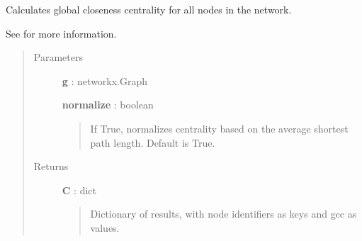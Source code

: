 \documentclass[letterpaper,10pt,english]{sphinxmanual}
\begin{document}
\begin{fulllineitems}
\label{tethne.analyze:tethne.analyze.graph.global_closeness_centrality}
Calculates global closeness centrality for all nodes in the network.

See {\hyperref[tethne.analyze:tethne.analyze.graph.node_global_closeness_centrality]{}} for more information.
\begin{quote}\begin{description}
\item[{Parameters }] \leavevmode
\textbf{g} : networkx.Graph

\textbf{normalize} : boolean
\begin{quote}

If True, normalizes centrality based on the average shortest path
length. Default is True.
\end{quote}

\item[{Returns }] \leavevmode
\textbf{C} : dict
\begin{quote}

Dictionary of results, with node identifiers as keys and gcc as values.
\end{quote}

\end{description}\end{quote}

\end{fulllineitems}

\end{document}
